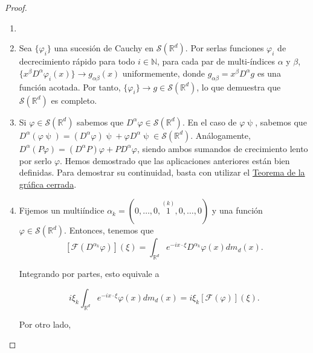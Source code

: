 \begin{proof}
\begin{enumerate}
\item[]
\item Sea $\{\varphi_{i}\}$ una sucesión de Cauchy en $\mathcal{S}(\mathds{R}^{d})$. Por serlas funciones $\varphi_{i}$ de decrecimiento rápido para todo $i\in\mathds{N}$, para cada par de multi-índices $\alpha$ y $\beta$, $\{x^{\beta}D^{\alpha}\varphi_{i} (x)\}\rightarrow g_{\alpha\beta}(x)$ uniformemente, donde $g_{\alpha\beta}=x^{\beta}D^{\alpha}g$ es una función acotada.  Por tanto, $\{\varphi_{i}\} \rightarrow g\in\mathcal{S}(\mathds{R}^{d})$, lo que demuestra que $\mathcal{S}(\mathds{R}^{d})$ es completo.
\item Si $\varphi\in \mathcal{S}(\mathds{R}^{d})$ sabemos que $D^{\alpha} \varphi \in \mathcal{S}(\mathds{R}^{d}) $. En el caso de $\varphi\uppsi$, sabemos que $D^{\alpha}(\varphi\uppsi) = (D^{\alpha}\varphi)\uppsi + \varphi D^{\alpha}\uppsi \in\mathcal{S}(\mathds{R}^{d})$. Análogamente, $D^{\alpha}(P\varphi) = (D^{\alpha}P)\varphi + PD^{\alpha}\varphi$, siendo ambos sumandos de crecimiento lento por serlo $\varphi$. Hemos demostrado que las aplicaciones anteriores están bien definidas. Para demostrar su continuidad, basta con utilizar el \hyperref[thm:h06]{Teorema de la gráfica cerrada}.
\item Fijemos un multiíndice $\alpha_{k} = (0,\ldots,0,\overset{(k)}{1},0,\ldots,0)$ y una función $\varphi\in \mathcal{S}(\mathds{R}^{d})$. Entonces, tenemos que 
\begin{equation}
\left[\mathcal{F}(D^{\alpha_{k}}\varphi)\right](\xi) 
=  \int_{\mathds{R}^{d}} e^{-ix\cdot\xi} D^{\alpha_{k}} \varphi(x)dm_{d}(x).
\end{equation}

Integrando por partes, esto equivale a 

\begin{equation}
i\xi_{k} \int_{\mathds{R}^{d}} e^{-ix\cdot\xi} \varphi(x)dm_{d}(x) =  i\xi_{k} [\mathcal{F}(\varphi)](\xi).
\end{equation}

Por otro lado, 


\end{enumerate}
\end{proof}
